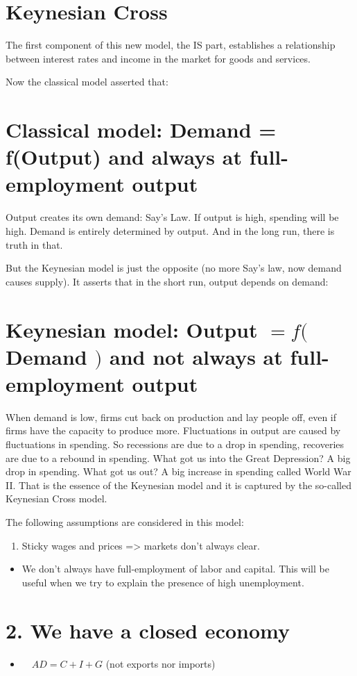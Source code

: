 \documentclass[10pt]{article}
\begin{document}
\section*{Keynesian Cross}
The first component of this new model, the IS part, establishes a relationship between interest rates and income in the market for goods and services.

Now the classical model asserted that:

\section*{Classical model: Demand = f(Output) and always at full-employment output}
Output creates its own demand: Say's Law. If output is high, spending will be high. Demand is entirely determined by output. And in the long run, there is truth in that.

But the Keynesian model is just the opposite (no more Say's law, now demand causes supply). It asserts that in the short run, output depends on demand:

\section*{Keynesian model: Output $=f($ Demand $)$ and not always at full-employment output}
When demand is low, firms cut back on production and lay people off, even if firms have the capacity to produce more. Fluctuations in output are caused by fluctuations in spending. So recessions are due to a drop in spending, recoveries are due to a rebound in spending. What got us into the Great Depression? A big drop in spending. What got us out? A big increase in spending called World War II. That is the essence of the Keynesian model and it is captured by the so-called Keynesian Cross model.

The following assumptions are considered in this model:

\begin{enumerate}
  \item Sticky wages and prices => markets don't always clear.
\end{enumerate}

\begin{itemize}
  \item We don't always have full-employment of labor and capital. This will be useful when we try to explain the presence of high unemployment.
\end{itemize}

\section*{2. We have a closed economy}
\begin{itemize}
  \item $\quad A D=C+I+G$ (not exports nor imports)
\end{itemize}
\end{document}
